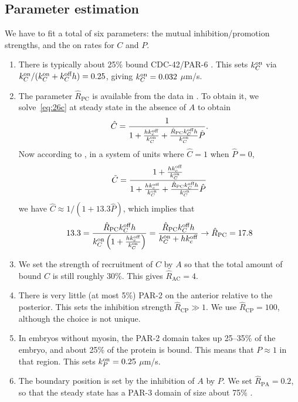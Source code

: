 \documentclass[11pt]{article}
\newcommand{\6}[1]{#1_{\text{6}}}
\newcommand{\3}[1]{#1_{\text{3}}}
\begin{document}
\subsection{Parameter estimation}
We have to fit a total of six parameters: the mutual inhibition/promotion strengths, and the on rates for $C$ and $P$. 
\begin{enumerate}
\item There is typically about 25\% bound CDC-42/PAR-6 \cite[Fig.~S3i]{gross2019guiding}. This sets $k^\text{on}_C$ via $k^\text{on}_C/(k^\text{on}_C+k^\text{off}_C h)=0.25$, giving $k^\text{on}_C=0.032$ $\mu$m/s. 
\item The parameter $\hat{R}_\text{PC}$ is available from the data in \cite{sailer2015dynamic}. To obtain it, we solve\ \eqref{eq:26c} at steady state in the absence of $A$ to obtain
\begin{equation}
\hat C = \frac{1}{1+\frac{h k^\text{off}_c}{k^\text{on}_C}+\frac{\hat R_\text{PC}k^\text{off}_C h}{k^\text{on}_C} \hat P}. 
\end{equation}
Now according to \cite{sailer2015dynamic}, in a system of units where $\hat C=1$ when $\hat P=0$,
\begin{equation*}
\tilde C =   \frac{1+\frac{h k^\text{off}_c}{k^\text{on}_C}}{1+\frac{h k^\text{off}_c}{k^\text{on}_C}+\frac{\hat R_\text{PC}k^\text{off}_C h}{k^\text{on}_C} \hat P}
\end{equation*} 
we have $\hat{C} \approx 1/(1+13.3\hat{P})$, which implies that 
\begin{equation*}
13.3 = \frac{\hat R_\text{PC}k^\text{off}_C h}{k^\text{on}_C\left(1+\frac{h k^\text{off}_c}{k^\text{on}_C}\right)}= \frac{\hat R_\text{PC}k^\text{off}_C h}{k^\text{on}_C+h k^\text{off}_c} \rightarrow \hat R_\text{PC}=17.8
\end{equation*}
\item We set the strength of recruitment of $C$ by $A$ so that the total amount of bound $C$ is still roughly 30\%. This gives $\hat R_\text{AC}=4$. 
\item There is very little (at most 5\%) PAR-2 on the anterior relative to the posterior. This sets the inhibition strength $\hat R_\text{CP} \gg 1$. We use $\hat R_\text{CP}=100$, although the choice is not unique.
\item In embryos without myosin, the PAR-2 domain takes up 25--35\% of the embryo, and about 25\% of the protein is bound. This means that $P \approx 1$ in that region. This sets $k^\text{on}_P=0.25$ $\mu$m/s. 
\item The boundary position is set by the inhibition of $A$ by $P$. We set $\hat R_\text{PA}=0.2$, so that the steady state has a PAR-3 domain of size about 75\% \cite[Fig.~5B]{zonies2010symmetry}. 
\end{enumerate}
\end{document}

